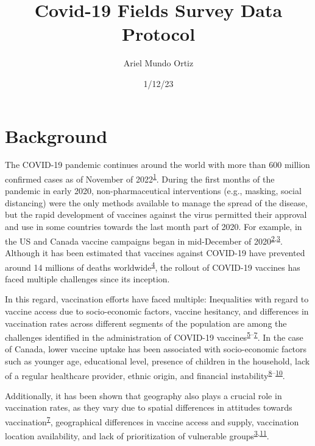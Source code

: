 \documentclass[
  letterpaper,
  DIV=11,
  numbers=noendperiod]{scrartcl}
\title{Covid-19 Fields Survey Data Protocol}
\author{Ariel Mundo Ortiz}
\date{1/12/23}
\begin{document}
\maketitle
\ifdefined\Shaded\renewenvironment{Shaded}{\begin{tcolorbox}[breakable, borderline west={3pt}{0pt}{shadecolor}, interior hidden, frame hidden, enhanced, sharp corners, boxrule=0pt]}{\end{tcolorbox}}\fi

\hypertarget{background}{%
\section{Background}\label{background}}

The COVID-19 pandemic continues around the world with more than 600
million confirmed cases as of November of
2022\textsuperscript{\protect\hyperlink{ref-WHO-Covid}{1}}. During the
first months of the pandemic in early 2020, non-pharmaceutical
interventions (e.g., masking, social distancing) were the only methods
available to manage the spread of the disease, but the rapid development
of vaccines against the virus permitted their approval and use in some
countries towards the last month part of 2020. For example, in the US
and Canada vaccine campaigns began in mid-December of
2020\textsuperscript{\protect\hyperlink{ref-tanne2020}{2},\protect\hyperlink{ref-bogoch2022}{3}}.
Although it has been estimated that vaccines against COVID-19 have
prevented around 14 millions of deaths
worldwide\textsuperscript{\protect\hyperlink{ref-watson2022}{4}}, the
rollout of COVID-19 vaccines has faced multiple challenges since its
inception.

In this regard, vaccination efforts have faced multiple: Inequalities
with regard to vaccine access due to socio-economic factors, vaccine
hesitancy, and differences in vaccination rates across different
segments of the population are among the challenges identified in the
administration of COVID-19
vaccines\textsuperscript{\protect\hyperlink{ref-gerretsen2021}{5}--\protect\hyperlink{ref-malik2020}{7}}.
In the case of Canada, lower vaccine uptake has been associated with
socio-economic factors such as younger age, educational level, presence
of children in the household, lack of a regular healthcare provider,
ethnic origin, and financial
instability\textsuperscript{\protect\hyperlink{ref-guay2022}{8}--\protect\hyperlink{ref-carter2022}{10}}.

Additionally, it has been shown that geography also plays a crucial role
in vaccination rates, as they vary due to spatial differences in
attitudes towards
vaccination\textsuperscript{\protect\hyperlink{ref-malik2020}{7}},
geographical differences in vaccine access and supply, vaccination
location availability, and lack of prioritization of vulnerable
groups\textsuperscript{\protect\hyperlink{ref-bogoch2022}{3},\protect\hyperlink{ref-nguyen2021}{11}}.
\end{document}
